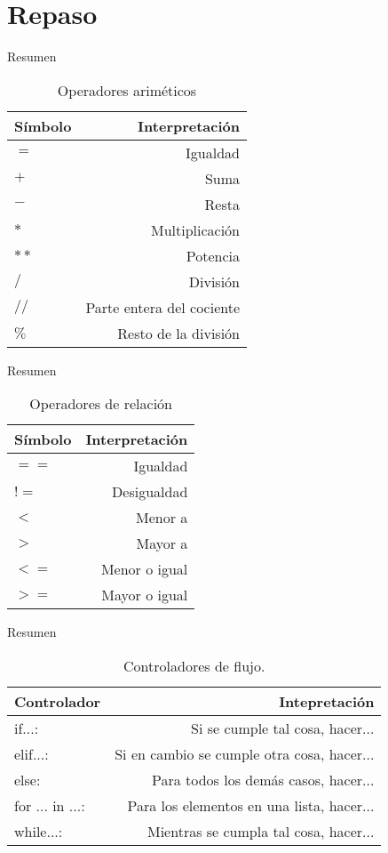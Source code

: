\documentclass[10pt]{beamer}
\begin{document}
\section{Repaso}
\begin{frame}{Resumen}
	\begin{table}
		\caption{Operadores ariméticos}
		\begin{tabular}{lr}
			\toprule
			Símbolo&Interpretación\\
			\midrule
		$=$ &Igualdad\\
		$+$ &Suma\\
		$-$ &Resta\\
		$*$ &Multiplicación\\
		$**$&Potencia\\
		$/$ &División\\
		$//$&Parte entera del cociente\\
		$\%$&Resto de la división\\
			\bottomrule
		\end{tabular}
	\end{table}
\end{frame}

\begin{frame}{Resumen}
	\begin{table}
		\caption{Operadores de relación}
		\begin{tabular}{lr}
			\toprule
			Símbolo&Interpretación\\
			\midrule
			$==$ &Igualdad\\
			$!=$&Desigualdad\\
			$<$ &Menor a\\
			$>$ &Mayor a\\
			$<=$ &Menor o igual\\
			$>=$ &Mayor o igual\\
			\bottomrule
		\end{tabular}
	\end{table}
\end{frame}

\begin{frame}{Resumen}
	\begin{table}
		\caption{Controladores de flujo.}
		\begin{tabular}{lr}
			\toprule
			Controlador&Intepretación\\
			\midrule
			if...:&Si se cumple tal cosa, hacer...\\
			elif...:&Si en cambio se cumple otra cosa, hacer...\\ 
			else:&Para todos los demás casos, hacer...\\
			for ... in ...:&Para los elementos en una lista, hacer...\\
			while...:&Mientras se cumpla tal cosa, hacer...\\ 
			\bottomrule
		\end{tabular}
	\end{table}
\end{frame}
\appendix
\end{document}
